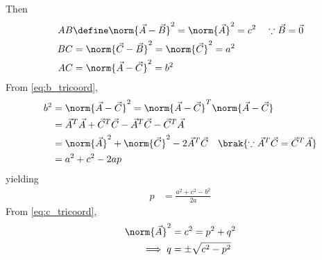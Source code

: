 \begin{enumerate}[label=\arabic*.,ref=\thesubsection.\theenumi]
Then
\begin{align}
\label{eq:c_tricoord}
AB &\define \norm{\vec{A}-\vec{B}}^2 = \norm{\vec{A}}^2  = c^2 \quad \because \vec{B} = \vec{0}
\\
\label{eq:a_tricoord}
BC &= \norm{\vec{C}-\vec{B}}^2 = \norm{\vec{C}}^2  = a^2
\\
AC &= \norm{\vec{A}-\vec{C}}^2 =    b^2
\label{eq:b_tricoord}
\end{align}
%
From \eqref{eq:b_tricoord},
\begin{align}
b^2 &=\norm{\vec{A}-\vec{C}}^2 = \norm{\vec{A}-\vec{C}}^T\norm{\vec{A}-\vec{C}}  
\\
&= \vec{A}^T\vec{A}+\vec{C}^T\vec{C}-\vec{A}^T\vec{C} - \vec{C}^T\vec{A} 
\\
&= \norm{\vec{A}}^2 + \norm{\vec{C}}^2 - 2\vec{A}^T\vec{C} \quad \brak{\because \vec{A}^T\vec{C} = \vec{C}^T\vec{A} } 
\\
&= a^2+c^2-2ap
\end{align}
%
yielding
\begin{align}
p&= \frac{a^2+c^2-b^2}{2a}
\end{align}
%
From \eqref{eq:c_tricoord}, 
\begin{align}
\norm{\vec{A}}^2 &= c^2 = p^2+q^2
\\
\implies q&= \pm \sqrt{c^2-p^2}
\end{align}


\end{enumerate}
